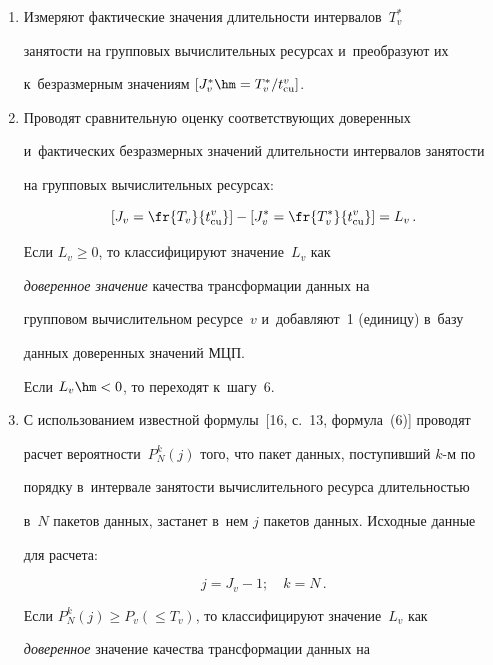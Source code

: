 \begin{enumerate}[1.]
\begin{itemize}
\end{itemize}

\item Измеряют фактические значения дли\-тель\-ности интервалов~$T_v^*$ 

за\-ня\-тости на групповых вы\-чис\-ли\-тель\-ных ресурсах и~преобразуют их 

к~без\-раз\-мер\-ным значениям $[J_v^* \hm= T_v^*/t^v_{\mathrm{cu}}]$.

\item Проводят сравнительную оценку со\-от\-вет\-ст\-ву\-ющих доверенных 

и~фактических без\-раз\-мер\-ных значений дли\-тель\-ности интервалов за\-ня\-тости 

на групповых вы\-чис\-ли\-тель\-ных ресурсах:

$$

\left[J_v = \fr{T_v}{t^v_{\mathrm{cu}}}\right] - \left[J_v^* = \fr{T_v^*}{t^v_{\mathrm{cu}}}\right] = L_v\,.

$$



Если $L_v \geq 0$, то классифицируют значение~$L_v$ как 

\textit{доверенное значение} качества трансформации данных на 

групповом вы\-чис\-ли\-тель\-ном ресурсе~$v$ и~до\-бав\-ля\-ют~1 (единицу) в~базу 

данных доверенных значений МЦП.



Если $L_v \hm< 0$, то переходят к~шагу~6.

\item С использованием известной формулы~[16, с.~13, формула~(6)] проводят 

расчет ве\-ро\-ят\-ности~$P_N^k(j)$ того, что пакет данных, по\-сту\-пив\-ший $k$-м по 

порядку в~интервале за\-ня\-тости вы\-чис\-ли\-тель\-но\-го ресурса дли\-тель\-ностью 

в~$N$ пакетов данных, застанет в~нем $j$ пакетов данных. Исходные данные 

для рас\-чета:

$$

j = J_v - 1;\quad k = N\,.

$$



Если $P_N^k(j) \geq P_v(\leq T_ v)$, то классифицируют значение~$L_v$ как 

\textit{доверенное} значение качества трансформации данных на 


\end{enumerate}
